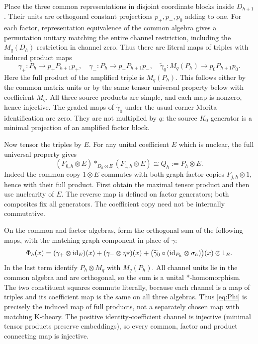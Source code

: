 \documentclass[11pt]{article}
\theoremstyle{remark}\newtheorem{remark}[theorem]{Remark}
\begin{document}
Place the three common representations in disjoint coordinate blocks
inside $D_{h+1}$. Their units are orthogonal constant projections
$p_+,p_-,p_0$ adding to one. For each factor, representation equivalence
of the common algebra gives a permutation unitary matching the entire
channel restriction, including the $M_q(D_h)$ restriction in channel
zero. Thus there are literal maps of triples with induced product maps
\[
 \gamma_+:P_h\to p_+P_{h+1}p_+,\quad
 \gamma_-:P_h\to p_-P_{h+1}p_-,\quad
 \widetilde\gamma_0:M_q(P_h)\to p_0P_{h+1}p_0.
\]
Here the full product of the amplified triple is $M_q(P_h)$.
This follows either by the common matrix units or by the same tensor
universal property below with coefficient $M_q$. All three source
products are simple, and each map is nonzero, hence injective.
The graded maps of $\widetilde\gamma_0$ under the usual corner Morita
identification are zero. They are not multiplied by $q$: the source
$K_0$ generator is a minimal projection of an amplified factor block.

Now tensor the triples by $E$. For any unital coefficient $E$ which is
nuclear, the full universal property gives
\begin{equation}\label{eq:tensor}
 (F_{0,h}\otimes E)*_{D_h\otimes E}(F_{1,h}\otimes E)
                  \cong Q_h:=P_h\otimes E.
\end{equation}
Indeed the common copy $1\otimes E$ commutes with both graph-factor
copies $F_{j,h}\otimes1$, hence with their full product. First obtain
the maximal tensor product and then use nuclearity of $E$. The reverse
map is defined on factor generators; both composites fix all generators.
The coefficient copy need not be internally commutative.

On the common and factor algebras, form the orthogonal sum of the
following maps, with the matching graph component in place of $\gamma$:
\begin{equation}\label{eq:Phi}
 \Phi_h(x)=
    (\gamma_+\otimes\mathrm{id}_E)(x)
   +(\gamma_-\otimes\eta\varepsilon)(x)
   +\bigl(\widetilde\gamma_0\circ(\mathrm{id}_{P_h}\otimes\sigma_h)\bigr)(x)
                                                        \otimes1_E.
\end{equation}
In the last term identify $P_h\otimes M_q$ with $M_q(P_h)$.
All channel units lie in the common algebra and are orthogonal, so the
sum is a unital *-homomorphism. The two constituent squares commute
literally, because each channel is a map of triples and its coefficient
map is the same on all three algebras. Thus \eqref{eq:Phi} is precisely
the induced map of full products, not a separately chosen map with
matching K-theory. The positive identity-coefficient channel is
injective (minimal tensor products preserve embeddings), so every
common, factor and product connecting map is injective.
\end{document}
